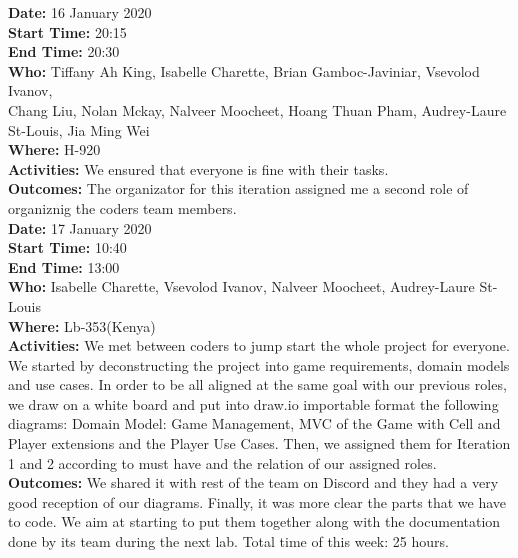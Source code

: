 \documentclass[12pt]{article}
\begin{document}
{\bf Date:} 16 January 2020\\
{\bf Start Time:} 20:15\\
{\bf End Time:} 20:30\\
{\bf Who:} Tiffany Ah King, Isabelle Charette, Brian Gamboc-Javiniar, Vsevolod Ivanov,\\
Chang Liu, Nolan Mckay, Nalveer Moocheet, Hoang Thuan Pham, Audrey-Laure St-Louis, Jia Ming Wei\\
{\bf Where:} H-920\\
{\bf Activities:} We ensured that everyone is fine with their tasks.\\
{\bf Outcomes:} The organizator for this iteration assigned me a second role of organiznig the coders team members.\\

{\bf Date:} 17 January 2020\\
{\bf Start Time:} 10:40\\
{\bf End Time:} 13:00\\
{\bf Who:} Isabelle Charette, Vsevolod Ivanov, Nalveer Moocheet, Audrey-Laure St-Louis\\
{\bf Where:} Lb-353(Kenya)\\
{\bf Activities:} We met between coders to jump start the whole project for everyone. We started by deconstructing the project into game requirements, domain models and use cases. In order to be all aligned at the same goal with our previous roles, we draw on a white board and put into draw.io importable format the following diagrams: Domain Model: Game Management, MVC of the Game with Cell and Player extensions and the Player Use Cases. Then, we assigned them for Iteration 1 and 2 according to must have and the relation of our assigned roles.\\
{\bf Outcomes:} We shared it with rest of the team on Discord and they had a very good reception of our diagrams. Finally, it was more clear the parts that we have to code. We aim at starting to put them together along with the documentation done by its team during the next lab. Total time of this week: 25 hours.\\

\pagebreak
\end{document}
